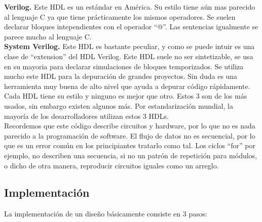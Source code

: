 \documentclass[twoside,spanish,ESP,MSc]{plantillaLabUPV}
\theoremstyle{definition}
\begin{document}
\checkmark\textbf{Verilog.} Este HDL es un estándar en América. Su estilo tiene aún mas parecido al lenguaje C ya que tiene prácticamente los mismos operadores. Se suelen declarar bloques intependientes con el operador ``@''. Las sentencias igualmente se parece mucho al lenguaje C.\\


\checkmark\textbf{System Verilog.} Este HDL es bastante peculiar, y como se puede intuir es una clase de ``extension'' del HDL Verilog. Este HDL suele no ser sintetizable, se usa en su mayoria para declarar simulaciones de bloques temporizados. Se utiliza mucho este HDL para la depuración de grandes proyectos. Sin duda es una herramienta muy buena de alto nivel que ayuda a depurar código rápidamente.\\




Cada HDL tiene su estilo y ninguno es mejor que otro. Estos 3 son de los más usados, sin embargo existen algunos más. Por estandarización mundial, la mayoría de los desarrolladores utilizan estos 3 HDLs.\\

Recordemos que este código describe circuitos y hardware, por lo que no es nada parecido a la programación de software. El flujo de datos no es secuencial, por lo que es un error común en los principiantes tratarlo como tal. Los ciclos ``for'' por ejemplo, no describen una secuencia, si no un patrón de repetición para módulos, o dicho de otra manera, reproducir circuitos iguales como un arreglo.

\subsection{Implementación}%

La implementación de un diseño básicamente consiste en 3 pasos:

%
\end{document}
